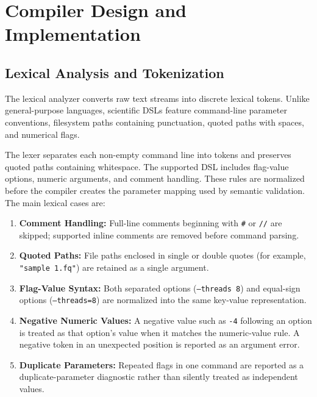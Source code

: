 \documentclass[12pt,a4paper]{article}
\begin{document}
\newpage

\section{Compiler Design and Implementation}

\subsection{Lexical Analysis and Tokenization}

The lexical analyzer converts raw text streams into discrete lexical tokens. Unlike general-purpose languages, scientific DSLs feature command-line parameter conventions, filesystem paths containing punctuation, quoted paths with spaces, and numerical flags.

The lexer separates each non-empty command line into tokens and preserves quoted paths containing whitespace. The supported DSL includes flag-value options, numeric arguments, and comment handling. These rules are normalized before the compiler creates the parameter mapping used by semantic validation. The main lexical cases are:
\begin{enumerate}
    \item \textbf{Comment Handling:} Full-line comments beginning with \texttt{\#} or \texttt{//} are skipped; supported inline comments are removed before command parsing.
    \item \textbf{Quoted Paths:} File paths enclosed in single or double quotes (for example, \texttt{"sample 1.fq"}) are retained as a single argument.
    \item \textbf{Flag-Value Syntax:} Both separated options (\texttt{--threads 8}) and equal-sign options (\texttt{--threads=8}) are normalized into the same key-value representation.
    \item \textbf{Negative Numeric Values:} A negative value such as \texttt{-4} following an option is treated as that option's value when it matches the numeric-value rule. A negative token in an unexpected position is reported as an argument error.
    \item \textbf{Duplicate Parameters:} Repeated flags in one command are reported as a duplicate-parameter diagnostic rather than silently treated as independent values.
\end{enumerate}
\end{document}
